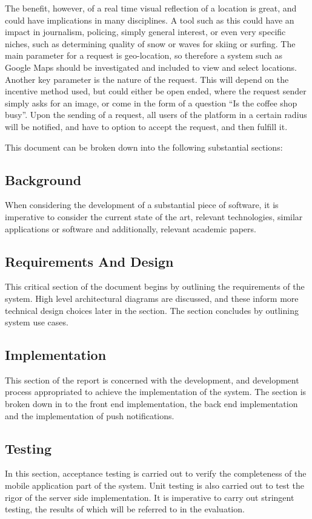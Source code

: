 \documentclass[a4paper]{article}
\begin{document}
The benefit, however, of a real time visual reflection of a location is great, and could have implications in many disciplines. A tool such as this could have an impact in journalism, policing, simply general interest, or even very specific niches, such as determining quality of snow or waves for skiing or surfing. The main parameter for a request is geo-location, so therefore a system such as Google Maps should be investigated and included to view and select locations. Another key parameter is the nature of the request. This will depend on the incentive method used, but could either be open ended, where the request sender simply asks for an image, or come in the form of a question “Is the coffee shop busy”. Upon the sending of a request, all users of the platform in a certain radius will be notified, and have to option to accept the request, and then fulfill it.

This document can be broken down into the following substantial sections:

\subsection{Background}
When considering the development of a substantial piece of software, it is imperative to consider the current state of the art, relevant technologies, similar applications or software and additionally, relevant academic papers.


\subsection{Requirements And Design}
This critical section of the document begins by outlining the requirements of the system. High level architectural diagrams are discussed, and these inform more technical design choices later in the section. The section concludes by outlining system use cases.


\subsection{Implementation}
This section of the report is concerned with the development, and development process appropriated to achieve the implementation of the system. The section is broken down in to the front end implementation, the back end implementation and the implementation of push notifications.
\subsection{Testing}
In this section, acceptance testing is carried out to verify the completeness of the mobile application part of the system. Unit testing is also carried out to test the rigor of the server side implementation. It is imperative to carry out stringent testing, the results of which will be referred to in the evaluation.
\end{document}
